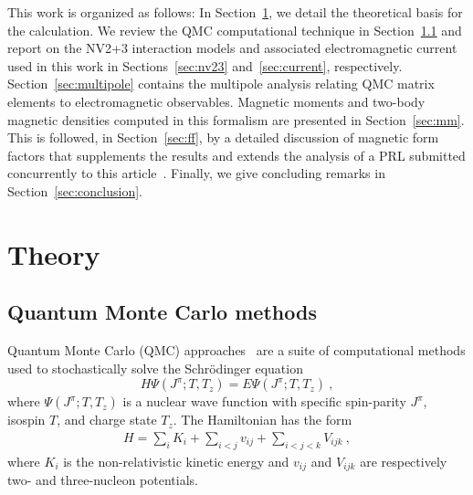 \documentclass[aps,prc,floatfix,showpacs,twocolumn, preprintnumbers]{revtex4-2}
\def\beqy{\begin{eqnarray}}
\def\eeqy{\end{eqnarray}}
\begin{document}
This work is organized as follows: In Section~\ref{sec:theory}, we detail the theoretical basis for the calculation. We review the QMC computational technique in Section~\ref{sec:qmc} and report on the NV2+3 interaction models and associated electromagnetic current used in this work in Sections~\ref{sec:nv23} and~\ref{sec:current}, respectively. Section~\ref{sec:multipole} contains the multipole analysis relating QMC matrix elements to electromagnetic observables. Magnetic moments and two-body magnetic densities computed in this formalism are presented in Section~\ref{sec:mm}. This is followed, in Section~\ref{sec:ff}, by a detailed discussion of magnetic form factors that supplements the results and extends the analysis of a PRL submitted concurrently to this article~\cite{prl}. Finally, we give concluding remarks in Section~\ref{sec:conclusion}.

\section{Theory}
\label{sec:theory}

\subsection{Quantum Monte Carlo methods}
\label{sec:qmc}

Quantum Monte Carlo (QMC) approaches~\cite{Carlson:2014vla} are a suite of computational methods used to stochastically solve the Schr\"{o}dinger equation 
\begin{equation}
H \Psi(J^\pi;T,T_z)= E \Psi(J^\pi;T,T_z) \ ,
\end{equation}
where $\Psi(J^\pi;T,T_z)$ is a nuclear wave function with specific spin-parity 
$J^\pi$, isospin $T$, and charge state $T_z$.
The Hamiltonian has the form
\beqy \label{eq:hamiltonian} H = \sum_{i} K_i + {\sum_{i<j}} v_{ij} + \sum_{i<j<k}
V_{ijk} \ ,
\eeqy
where $K_i$ is the non-relativistic kinetic energy and $v_{ij}$ and $V_{ijk}$
are respectively two- and three-nucleon potentials.
\end{document}
